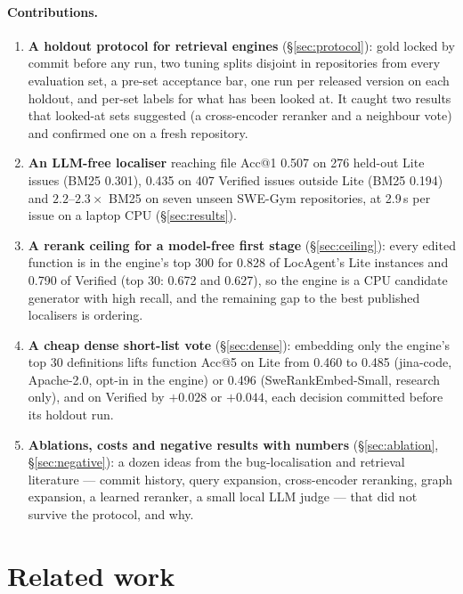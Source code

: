 \documentclass[10pt,twocolumn]{article}
\makeatletter
\newcommand{\accat}[1]{Acc@#1}
\makeatother
\begin{document}
\paragraph{Contributions.}
\begin{enumerate}
  \item \textbf{A holdout protocol for retrieval engines} (\S\ref{sec:protocol}): gold locked by
  commit before any run, two tuning splits disjoint in repositories from every evaluation set, a
  pre-set acceptance bar, one run per released version on each holdout, and per-set labels for what
  has been looked at. It caught two results that looked-at sets suggested (a cross-encoder reranker
  and a neighbour vote) and confirmed one on a fresh repository.
  \item \textbf{An LLM-free localiser} reaching file \accat{1} 0.507 on 276 held-out Lite issues (BM25
  0.301), 0.435 on 407 Verified issues outside Lite (BM25 0.194) and $2.2$--$2.3\times$ BM25 on seven unseen
  SWE-Gym repositories, at 2.9\,s per issue on a laptop CPU (\S\ref{sec:results}).
  \item \textbf{A rerank ceiling for a model-free first stage} (\S\ref{sec:ceiling}): every edited
  function is in the engine's top 300 for 0.828 of LocAgent's Lite instances and 0.790 of Verified
  (top 30: 0.672 and 0.627), so the engine is a CPU candidate generator with high recall, and the
  remaining gap to the best published localisers is ordering.
  \item \textbf{A cheap dense short-list vote} (\S\ref{sec:dense}): embedding only the engine's top
  30 definitions lifts function \accat{5} on Lite from 0.460 to 0.485 (jina-code, Apache-2.0, opt-in
  in the engine) or 0.496 (SweRankEmbed-Small, research only), and on Verified by $+0.028$ or
  $+0.044$, each decision committed before its holdout run.
  \item \textbf{Ablations, costs and negative results with numbers} (\S\ref{sec:ablation},
  \S\ref{sec:negative}): a dozen ideas from the bug-localisation and retrieval literature --- commit
  history, query expansion, cross-encoder reranking, graph expansion, a learned reranker, a small
  local LLM judge --- that did not survive the protocol, and why.
\end{enumerate}

\section{Related work}
\label{sec:related}
\end{document}

